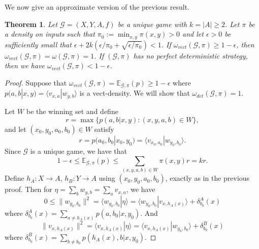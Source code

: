 \documentclass[11pt]{amsart}
\newtheorem{thm}{Theorem}[section]
\theoremstyle{definition}
\newcommand{\bb}[1]{\mathbb{#1}}
\newcommand{\cl}[1]{\mathcal{#1}}
\begin{document}
We now give an approximate version of the previous result.

 \begin{thm}\label{near1}
   Let $\mathcal{G}=(X,Y,A,f)$ be a unique game with $k=|A|\ge2$. Let
   $\pi$ be a density on inputs such that
   $\pi_0:=\min_{x,y}\pi(x,y)>0$ and let
   $\epsilon>0$ be sufficiently small that
   $\epsilon+2k(\epsilon/\pi_0+\sqrt{\epsilon/\pi_0})<1$. %
     If $\omega_{vect}(\mathcal{G},\pi)\ge 1- \epsilon$, then $\omega_{vect}(\cl G, \pi) = \omega(\cl G, \pi) =1$.
   If $(\mathcal{G},\pi)$ has no perfect deterministic strategy, then
   we have $\omega_{vect}(\cl G, \pi) <1-\epsilon$.
 \end{thm}
 \begin{proof}
   Suppose that $\omega_{vect}(\mathcal{G},\pi)=\bb E_{\cl G,\pi}(p)\ge 1-\epsilon$ where $p(a,b|x,y)=\langle v_{x,a}|w_{y,b}\rangle$ is a vect-density. We will show that $\omega_{det}(\mathcal{G},\pi)=1$.

   Let $W$ be the winning set and define
\[ r= \max \{ p(a,b|x,y) :  (x,y,a,b) \in W \},\]
and let $(x_0,y_0,a_0,b_0) \in W$ satisfy
\[r= p(a_0,b_0 | x_0, y_0) = \langle v_{x_0,a_0} | w_{y_0,b_0} \rangle.\]
Since $\mathcal{G}$ is a unique game, we have that
\[ 1 - \epsilon \le \bb E_{\cl G,\pi}(p) \le \sum_{(x,y,a,b) \in W} \pi(x,y) r = k r.\]
Define $h_A:X\to A$, $h_B:Y\to A$ using $(x_0,y_0,a_0,b_0)$, exactly as in the previous proof. Then for $\eta=\sum_b w_{y,b}=\sum_a v_{x,a}$, we have
 \[0\le \|w_{y_0,b_0}\|^2=\langle w_{y_0,b_0}|\eta\rangle=\langle w_{y_0,b_0}|v_{x,h_A(x)}\rangle+ \delta_{b_0}^A(x)\]
where $\delta_{b_0}^A(x)=\sum_{a\ne h_A(x)}p(a,b_0|x,y_0)$. And
\[ \|v_{x,h_A(x)}\|^2=\langle v_{x,h_A(x)}|\eta\rangle=\langle v_{x,h_A(x)}|w_{y_0,b_0}\rangle+\delta_{b_0}^B(x)\]
where
$\delta_{b_0}^B(x)=\sum_{b\ne b_0}p(h_A(x),b|x,y_0)$.


\end{proof}
\end{document}
